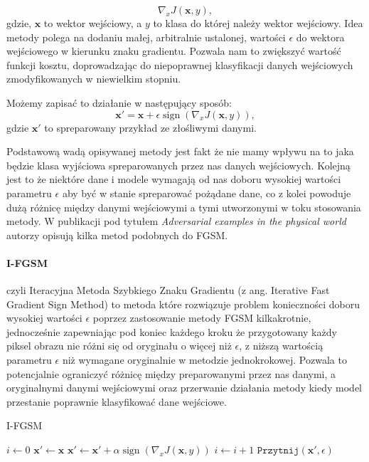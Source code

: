 \documentclass[
    left=2.5cm,         %
    right=2.5cm,        %
    top=2.5cm,          %
    bottom=3cm,         %
    bindingoffset=6mm,  %
    nohyphenation=false %
]{eiti/eiti-thesis}
\renewcommand{\vec}[1]{\mathbf{#1}}
\newcommand{\function}[1]{\texttt{#1}}
\begin{document}
    \begin{equation}
        \nabla_{x} J(\vec{x}, y),
    \end{equation}
    gdzie, $\vec{x}$ to wektor wejściowy, a $y$ to klasa do której należy wektor wejściowy.
    Idea metody polega na dodaniu małej, arbitralnie ustalonej, wartości  \(\epsilon\) do
    wektora wejściowego w kierunku znaku gradientu. Pozwala nam to zwiększyć wartość funkcji kosztu,
    doprowadzając do niepoprawnej klasyfikacji danych wejściowych zmodyfikowanych w niewielkim stopniu.


    Możemy zapisać to działanie w następujący sposób:
    \begin{equation}
    \vec{x'} = \vec{x} + \epsilon\operatorname{sign}(\nabla_{x} J(\vec{x}, y)),
    \end{equation}
    gdzie $\vec{x'}$ to spreparowany przykład ze złośliwymi danymi.

    Podstawową wadą opisywanej metody jest fakt że nie mamy wpływu na to jaka będzie klasa wyjściowa
    spreparowanych przez nas danych wejściowych. Kolejną jest to że niektóre dane i modele wymagają od nas
    doboru wysokiej wartości parametru $\epsilon$ aby być w stanie spreparować pożądane dane, co z kolei powoduje dużą
    różnicę między danymi wejściowymi a tymi utworzonymi w toku stosowania metody.
    W publikacji pod tytułem \textit{Adversarial examples in the physical world}\cite{DBLP:journals/corr/KurakinGB16}
    autorzy opisują kilka metod podobnych do FGSM.

    \paragraph{I-FGSM}\label{ifgsm-algorith}
    czyli Iteracyjna Metoda Szybkiego Znaku Gradientu (z ang. Iterative Fast Gradient Sign Method) to metoda
    które rozwiązuje problem konieczności doboru wysokiej wartości $\epsilon$ poprzez zastosowanie metody FGSM kilkakrotnie,
    jednocześnie zapewniając pod koniec każdego kroku że przygotowany każdy piksel obrazu nie różni się od oryginału o więcej
    niż $\epsilon$, z niższą wartością parametru $\epsilon$ niż wymagane oryginalnie w metodzie jednokrokowej.
    Pozwala to  potencjalnie ograniczyć różnicę między preparowanymi przez nas danymi, a oryginalnymi danymi wejściowymi
    oraz przerwanie działania metody kiedy model przestanie poprawnie klasyfikować dane wejściowe.

    \begin{algorithm}
    \caption{I-FGSM}\label{IFGSM}
    \begin{algorithmic}[1]
    \State $i \gets 0$
    \State $\vec{x'} \gets \vec{x}$
        \State $\vec{x'} \gets \vec{x'} + \alpha\operatorname{sign}(\nabla_{x} J(\vec{x}, y))$
        \State $i \gets i+1$
        \State $\function{Przytnij}(\vec{x'}, \epsilon)$
    \EndWhile
    \end{algorithmic}
    \end{algorithm}
\end{document}
